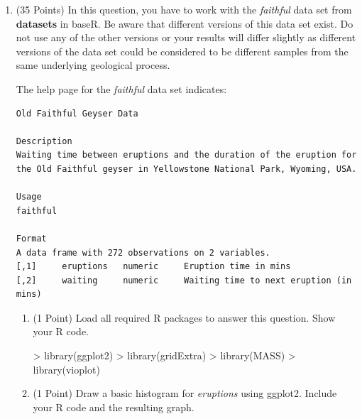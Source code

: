 \documentclass[12pt,letterpaper,final]{article}
\begin{document}
\begin{enumerate}

\item (35 Points)
In this question, you have to work with the {\it faithful} data set from {\bf datasets} in baseR. 
Be aware that different versions of this data set exist. Do not use any of
the other versions or your results will differ slightly as different versions
of the data set
could be considered to be different samples from the same underlying geological process.

The help page for the {\it faithful} data set indicates:
\begin{verbatim}
Old Faithful Geyser Data

Description
Waiting time between eruptions and the duration of the eruption for 
the Old Faithful geyser in Yellowstone National Park, Wyoming, USA.

Usage
faithful

Format
A data frame with 272 observations on 2 variables.
[,1]	 eruptions	 numeric	 Eruption time in mins
[,2]	 waiting	 numeric	 Waiting time to next eruption (in mins)
\end{verbatim}

\begin{enumerate}
\item (1 Point) Load all required R packages to answer this question. Show your R code.

\begin{Schunk}
\begin{Sinput}
> library(ggplot2)
> library(gridExtra)
> library(MASS)
> library(vioplot)
\end{Sinput}
\end{Schunk}





\item (1 Point) Draw a basic histogram for {\it eruptions} using ggplot2.
Include your R code and the resulting graph.


\end{enumerate}
\end{enumerate}
\end{document}
